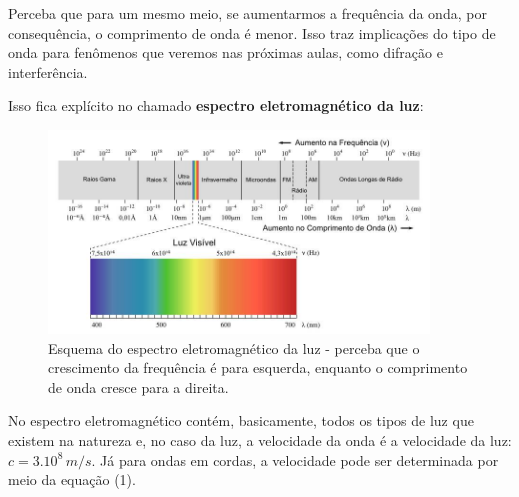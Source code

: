 \documentclass[12pt]{extarticle}
\newcommand{\<}{\langle}
\renewcommand{\>}{\rangle}
\theoremstyle{definition}
\begin{document}
Perceba que para um mesmo meio, se aumentarmos a frequência da onda, por consequência, o comprimento de onda é menor. Isso traz implicações do tipo de onda para fenômenos que veremos nas próximas aulas, como difração e interferência.

Isso fica explícito no chamado \textbf{espectro eletromagnético da luz}:
\begin{figure}[H]
    \centering
    \includegraphics[width=0.9\textwidth]{espectro.jpg}
    \caption{Esquema do espectro eletromagnético da luz - perceba que o crescimento da frequência é para esquerda, enquanto o comprimento de onda cresce para a direita.}
    \label{fig:espectro}
\end{figure}

No espectro eletromagnético contém, basicamente, todos os tipos de luz que existem na natureza e, no caso da luz, a velocidade da onda é a velocidade da luz: $c=3.10^8\,m/s$. Já para ondas em cordas, a velocidade pode ser determinada por meio da equação (1).
\end{document}
